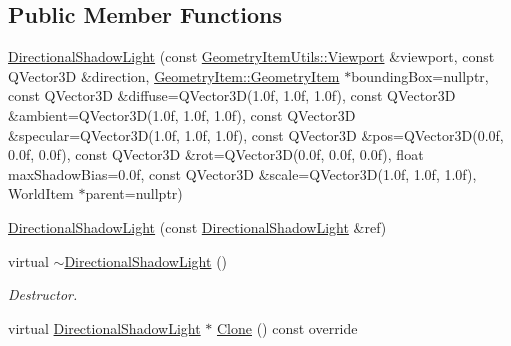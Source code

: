 \subsection*{Public Member Functions}
\begin{DoxyCompactItemize}
\item 
\mbox{\hyperlink{class_geometry_engine_1_1_geometry_world_item_1_1_geometry_light_1_1_directional_shadow_light_a059cd23ce7226fe1cab83296fd29c62d}{Directional\+Shadow\+Light}} (const \mbox{\hyperlink{class_geometry_engine_1_1_geometry_item_utils_1_1_viewport}{Geometry\+Item\+Utils\+::\+Viewport}} \&viewport, const Q\+Vector3D \&direction, \mbox{\hyperlink{class_geometry_engine_1_1_geometry_world_item_1_1_geometry_item_1_1_geometry_item}{Geometry\+Item\+::\+Geometry\+Item}} $\ast$bounding\+Box=nullptr, const Q\+Vector3D \&diffuse=Q\+Vector3D(1.\+0f, 1.\+0f, 1.\+0f), const Q\+Vector3\+D \&ambient=\+Q\+Vector3\+D(1.\+0f, 1.\+0f, 1.\+0f), const Q\+Vector3\+D \&specular=\+Q\+Vector3\+D(1.\+0f, 1.\+0f, 1.\+0f), const Q\+Vector3\+D \&pos=\+Q\+Vector3\+D(0.\+0f, 0.\+0f, 0.\+0f), const Q\+Vector3\+D \&rot=\+Q\+Vector3\+D(0.\+0f, 0.\+0f, 0.\+0f), float max\+Shadow\+Bias=0.\+0f, const Q\+Vector3\+D \&scale=\+Q\+Vector3\+D(1.\+0f, 1.\+0f, 1.\+0f), World\+Item $\ast$parent=nullptr)
\item 
\mbox{\hyperlink{class_geometry_engine_1_1_geometry_world_item_1_1_geometry_light_1_1_directional_shadow_light_ad01c71215f6c7c3065f9d6dcc0ea195c}{Directional\+Shadow\+Light}} (const \mbox{\hyperlink{class_geometry_engine_1_1_geometry_world_item_1_1_geometry_light_1_1_directional_shadow_light}{Directional\+Shadow\+Light}} \&ref)
\item 
\mbox{\label{class_geometry_engine_1_1_geometry_world_item_1_1_geometry_light_1_1_directional_shadow_light_aa35bdba1338d8ba80a7d59558df8a105}} 
virtual \mbox{\hyperlink{class_geometry_engine_1_1_geometry_world_item_1_1_geometry_light_1_1_directional_shadow_light_aa35bdba1338d8ba80a7d59558df8a105}{$\sim$\+Directional\+Shadow\+Light}} ()
\begin{DoxyCompactList}\small\item\em Destructor. \end{DoxyCompactList}\item 
virtual \mbox{\hyperlink{class_geometry_engine_1_1_geometry_world_item_1_1_geometry_light_1_1_directional_shadow_light}{Directional\+Shadow\+Light}} $\ast$ \mbox{\hyperlink{class_geometry_engine_1_1_geometry_world_item_1_1_geometry_light_1_1_directional_shadow_light_ae5016cad41a62c4c870a942acc3f9afe}{Clone}} () const override

\end{DoxyCompactItemize}
